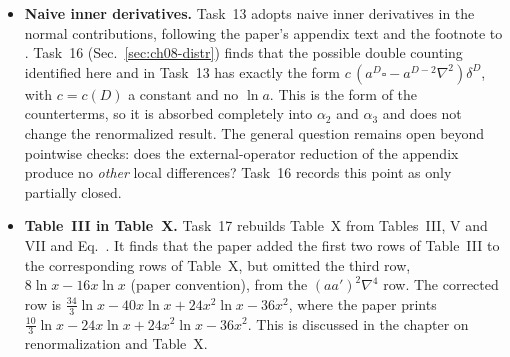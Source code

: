 \begin{notebox}
\begin{itemize}[leftmargin=12pt,itemsep=1pt]
\item \textbf{Naive inner derivatives.} Task~13 adopts naive inner derivatives in the normal contributions, following the paper's appendix text and the footnote to .
Task~16 (Sec.~\ref{sec:ch08-distr}) finds that the possible double counting identified here and in Task~13 has exactly the form $c\,(a^D\square-a^{D-2}\nabla^2)\delta^D$, with $c=c(D)$ a constant and no $\ln a$.
This is the form of the counterterms, so it is absorbed completely into $\alpha_2$ and $\alpha_3$ and does not change the renormalized result.
The general question remains open beyond pointwise checks: does the external-operator reduction of the appendix produce no \emph{other} local differences? Task~16 records this point as only partially closed.
\item \textbf{Table~III in Table~X.} Task~17 rebuilds Table~X from Tables~III, V and VII and Eq.~.
It finds that the paper added the first two rows of Table~III to the corresponding rows of Table~X, but omitted the third row, $8\ln x-16x\ln x$ (paper convention), from the $(aa')^2\nabla^4$ row.
The corrected row is $\frac{34}{3}\ln x-40x\ln x+24x^2\ln x-36x^2$, where the paper prints $\frac{10}{3}\ln x-24x\ln x+24x^2\ln x-36x^2$.
This is discussed in the chapter on renormalization and Table~X.
\end{itemize}
\end{notebox}
